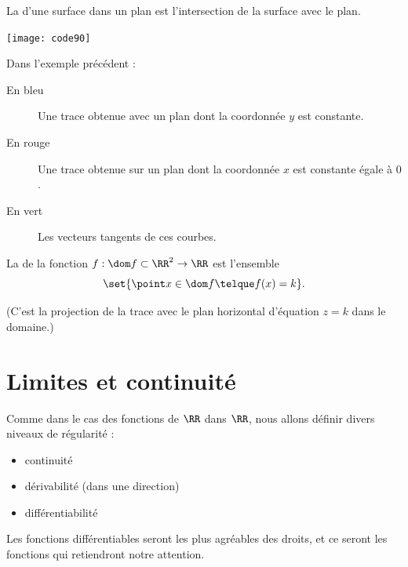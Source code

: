 \begin{frame}
  \begin{definition}
    La  d'une surface dans un plan est l'intersection de la surface avec le plan.
  \end{definition}\pause{}
  \begin{example}
    \begin{center}
      \texttt{[image: code90]}
    \end{center}
  \end{example}
\end{frame}
\begin{frame}
  Dans l'exemple précédent :
  \begin{description}
    \item[En bleu] Une trace obtenue avec un plan dont la coordonnée \(y\) est constante.
    \item[En rouge] Une trace obtenue sur un plan dont la coordonnée \(x\) est constante égale à \(0\).
    \item[En vert] Les vecteurs tangents de ces courbes.
  \end{description}
\end{frame}

\begin{frame}
  \begin{definition}
    La  de la fonction \(f : \dom f\subset \RR^{2} \to \RR\) est l'ensemble
    \begin{equation*}
      \set{ \point x \in \dom f \telque f(x) =  k}.
    \end{equation*}
  \end{definition}
  (C'est la projection de la trace avec le plan horizontal d'équation \(z = k\) dans le domaine.)
\end{frame}
\section{Limites et continuité}
\label{sec:continuite}
\begin{frame}
  \begin{remark*}
    Comme dans le cas des fonctions de \(\RR\) dans \(\RR\), nous allons définir divers niveaux de régularité\pause{} :
    \begin{itemize}[<+->]
    \item continuité
    \item dérivabilité (dans une direction)
    \item différentiabilité
    \end{itemize}
  \end{remark*}\pause{}
  Les fonctions différentiables seront les plus \og agréables\fg{} des droits, et ce seront les fonctions qui retiendront notre attention.
\end{frame}


